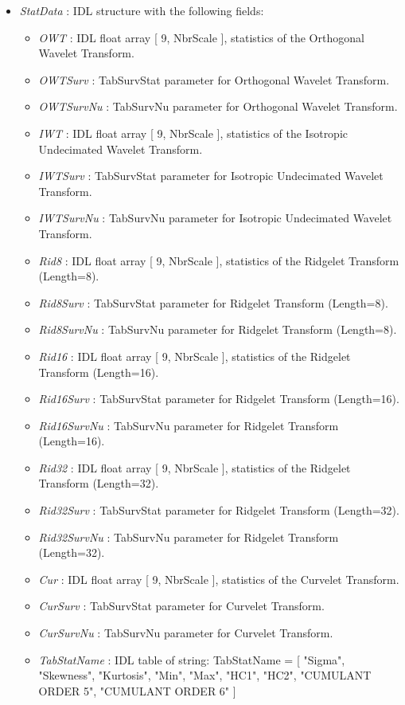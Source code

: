 \begin{itemize}
\item {\em StatData} : IDL structure with the following fields:
\begin{itemize}
\item {\em OWT} : IDL float array [ 9, NbrScale ], statistics of the Orthogonal Wavelet Transform.
\item {\em OWTSurv} : TabSurvStat parameter for Orthogonal Wavelet Transform.
\item {\em OWTSurvNu} : TabSurvNu parameter for Orthogonal Wavelet Transform.
\item {\em IWT} : IDL float array [ 9, NbrScale ], statistics of the Isotropic Undecimated Wavelet Transform.
\item {\em IWTSurv} : TabSurvStat parameter for Isotropic Undecimated Wavelet Transform.
\item {\em IWTSurvNu} : TabSurvNu parameter for Isotropic Undecimated Wavelet Transform.
\item {\em Rid8} : IDL float array [ 9, NbrScale ], statistics of the Ridgelet Transform (Length=8).
\item {\em Rid8Surv} : TabSurvStat parameter for Ridgelet Transform (Length=8).
\item {\em Rid8SurvNu} : TabSurvNu parameter for Ridgelet Transform (Length=8).
\item {\em Rid16} : IDL float array [ 9, NbrScale ], statistics of the Ridgelet Transform (Length=16).
\item {\em Rid16Surv} : TabSurvStat parameter for Ridgelet Transform (Length=16).
\item {\em Rid16SurvNu} : TabSurvNu parameter for Ridgelet Transform (Length=16).
\item {\em Rid32} : IDL float array [ 9, NbrScale ], statistics of the Ridgelet Transform (Length=32).
\item {\em Rid32Surv} : TabSurvStat parameter for Ridgelet Transform (Length=32).
\item {\em Rid32SurvNu} : TabSurvNu parameter for Ridgelet Transform (Length=32).
\item {\em Cur} : IDL float array [ 9, NbrScale ], statistics of the Curvelet Transform.
\item {\em CurSurv} : TabSurvStat parameter for Curvelet Transform.
\item {\em CurSurvNu} : TabSurvNu parameter for Curvelet Transform.
\item {\em TabStatName} : IDL table of string: TabStatName = [ "Sigma", "Skewness", "Kurtosis", "Min", "Max", "HC1", "HC2", "CUMULANT ORDER 5", "CUMULANT ORDER 6" ]

\end{itemize}
\end{itemize}
